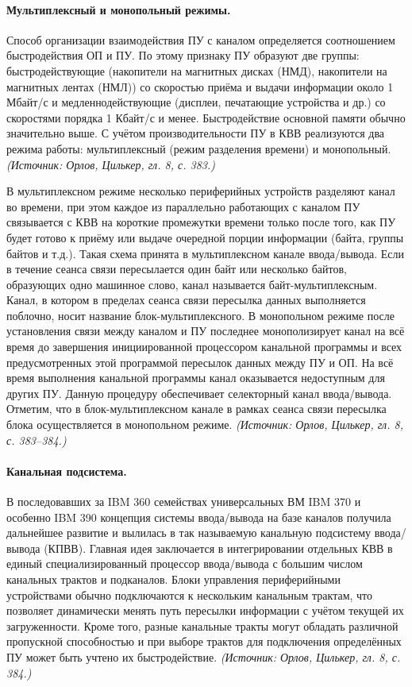 \documentclass[a4paper,12pt]{article}
\begin{document}
\paragraph{Мультиплексный и монопольный режимы.}
Способ организации взаимодействия ПУ с каналом определяется соотношением быстродействия ОП и ПУ. По этому признаку ПУ образуют две группы: быстродействующие (накопители на магнитных дисках (НМД), накопители на магнитных лентах (НМЛ)) со скоростью приёма и выдачи информации около 1 Мбайт/с и медленнодействующие (дисплеи, печатающие устройства и др.) со скоростями порядка 1 Кбайт/с и менее. Быстродействие основной памяти обычно значительно выше. С учётом производительности ПУ в КВВ реализуются два режима работы: мультиплексный (режим разделения времени) и монопольный.
\textit{(Источник: Орлов, Цилькер, гл. 8, с. 383.)}

В мультиплексном режиме несколько периферийных устройств разделяют канал во времени, при этом каждое из параллельно работающих с каналом ПУ связывается с КВВ на короткие промежутки времени только после того, как ПУ будет готово к приёму или выдаче очередной порции информации (байта, группы байтов и т.д.). Такая схема принята в мультиплексном канале ввода/вывода. Если в течение сеанса связи пересылается один байт или несколько байтов, образующих одно машинное слово, канал называется байт-мультиплексным. Канал, в котором в пределах сеанса связи пересылка данных выполняется поблочно, носит название блок-мультиплексного. В монопольном режиме после установления связи между каналом и ПУ последнее монополизирует канал на всё время до завершения инициированной процессором канальной программы и всех предусмотренных этой программой пересылок данных между ПУ и ОП. На всё время выполнения канальной программы канал оказывается недоступным для других ПУ. Данную процедуру обеспечивает селекторный канал ввода/вывода. Отметим, что в блок-мультиплексном канале в рамках сеанса связи пересылка блока осуществляется в монопольном режиме.
\textit{(Источник: Орлов, Цилькер, гл. 8, с. 383--384.)}

\paragraph{Канальная подсистема.}
В последовавших за IBM 360 семействах универсальных ВМ IBM 370 и особенно IBM 390 концепция системы ввода/вывода на базе каналов получила дальнейшее развитие и вылилась в так называемую канальную подсистему ввода/вывода (КПВВ). Главная идея заключается в интегрировании отдельных КВВ в единый специализированный процессор ввода/вывода с большим числом канальных трактов и подканалов. Блоки управления периферийными устройствами обычно подключаются к нескольким канальным трактам, что позволяет динамически менять путь пересылки информации с учётом текущей их загруженности. Кроме того, разные канальные тракты могут обладать различной пропускной способностью и при выборе трактов для подключения определённых ПУ может быть учтено их быстродействие.
\textit{(Источник: Орлов, Цилькер, гл. 8, с. 384.)}
\end{document}
